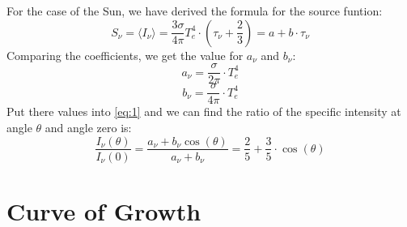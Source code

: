 For the case of the Sun, we have derived the formula for the source funtion:
\begin{equation}
   S_{\nu}=\langle I_{\nu} \rangle =\frac{3 \sigma}{4 \pi} T_{e}^{4} \cdot (\tau_{\nu}+\frac{2}{3}) = a + b\cdot \tau_{\nu}
\end{equation}
Comparing the coefficients, we get the value for $a_{\nu}$ and $b_{\nu}$:
\begin{equation}
   a_{\nu}=\frac{\sigma}{2\pi}\cdot T_{e}^{4}
\end{equation}
\begin{equation}
   b_{\nu}=\frac{\sigma}{4\pi}\cdot T_{e}^{4}
\end{equation}
Put there values into \eqref{eq:1} and we can find the ratio of the specific intensity at angle $\theta$ and angle zero is:
\begin{equation}
   \frac{I_{\nu}(\theta)}{I_{\nu}(0)}=\frac{a_{\nu}+b_{\nu}\cos(\theta)}{a_{\nu}+b_{\nu}}=\frac{2}{5}+\frac{3}{5}\cdot \cos(\theta)
\end{equation}



\section{Curve of Growth}\label{sec:growthcurve}


